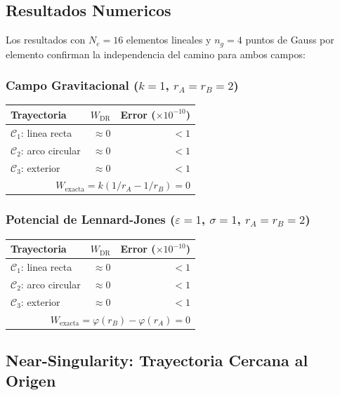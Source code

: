 \documentclass[12pt,a4paper]{article}
\begin{document}
\subsection{Resultados Numericos}

Los resultados con $N_e = 16$ elementos lineales y $n_g = 4$ puntos de
Gauss por elemento confirman la independencia del camino para ambos campos:

\subsubsection{Campo Gravitacional ($k=1$, $r_A = r_B = 2$)}

\begin{center}
\begin{tabular}{lrr}
\toprule
Trayectoria & $W_{\text{DR}}$ & Error ($\times 10^{-10}$) \\
\midrule
$\mathcal{C}_1$: linea recta   & $\approx 0$ & $< 1$ \\
$\mathcal{C}_2$: arco circular & $\approx 0$ & $< 1$ \\
$\mathcal{C}_3$: exterior      & $\approx 0$ & $< 1$ \\
\bottomrule
\multicolumn{3}{r}{$W_{\text{exacta}} = k(1/r_A - 1/r_B) = 0$}
\end{tabular}
\end{center}

\subsubsection{Potencial de Lennard-Jones ($\varepsilon=1$, $\sigma=1$, $r_A=r_B=2$)}

\begin{center}
\begin{tabular}{lrr}
\toprule
Trayectoria & $W_{\text{DR}}$ & Error ($\times 10^{-10}$) \\
\midrule
$\mathcal{C}_1$: linea recta   & $\approx 0$ & $< 1$ \\
$\mathcal{C}_2$: arco circular & $\approx 0$ & $< 1$ \\
$\mathcal{C}_3$: exterior      & $\approx 0$ & $< 1$ \\
\bottomrule
\multicolumn{3}{r}{$W_{\text{exacta}} = \varphi(r_B) - \varphi(r_A) = 0$}
\end{tabular}
\end{center}

\subsection{Near-Singularity: Trayectoria Cercana al Origen}
\end{document}
